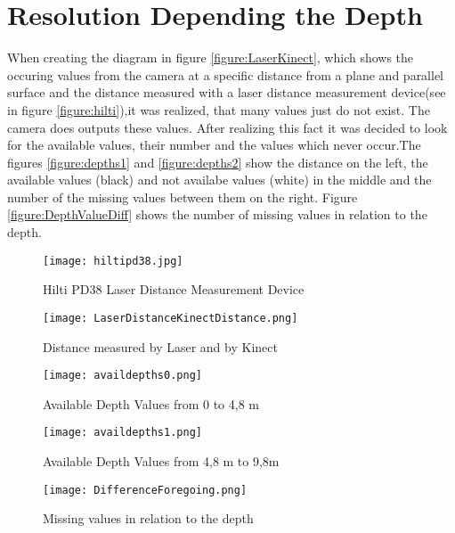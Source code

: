 \section{Resolution Depending the Depth} \label{resdepDepth}
When creating the diagram in figure \vref{figure:LaserKinect}, which shows the occuring values from the camera 
at a specific distance from a plane and parallel surface and the distance measured with a laser distance measurement 
device(see in figure \vref{figure:hilti}),it was realized, that many values just do not exist. The camera does outputs 
these values. After realizing this fact it was decided to look for the available values, their number and the values which 
never occur.The figures \vref{figure:depths1} and \vref{figure:depths2} show the distance on the left, 
the available values (black) and not availabe values (white) in the middle and the number of the missing values between them 
on the right. Figure \vref{figure:DepthValueDiff} shows the number of missing values in relation to the depth.

\begin{figure}[htp]
\begin{center}
  \texttt{[image: hiltipd38.jpg]}
  \caption{Hilti PD38 Laser Distance Measurement Device}
  \label{figure:hilti}
\end{center}
\end{figure}
\begin{figure}[htp]

\begin{center}
  \texttt{[image: LaserDistanceKinectDistance.png]}
  \caption{Distance measured by Laser and by Kinect}
  \label{figure:LaserKinect}
\end{center}
\end{figure}

\begin{figure}[htp]
\begin{center}
  \texttt{[image: availdepths0.png]}
  \caption{Available Depth Values from 0 to 4,8 m}
  \label{figure:depths1}
\end{center}
\end{figure}

\begin{figure}[htp]
\begin{center}
  \texttt{[image: availdepths1.png]}
  \caption{Available Depth Values from 4,8 m to 9,8m}
  \label{figure:depths2}
\end{center}
\end{figure}

\begin{figure}[htp]
\begin{center}
  \texttt{[image: DifferenceForegoing.png]}
  \caption{Missing values in relation to the depth}
  \label{figure:DepthValueDiff}
\end{center}
\end{figure}
